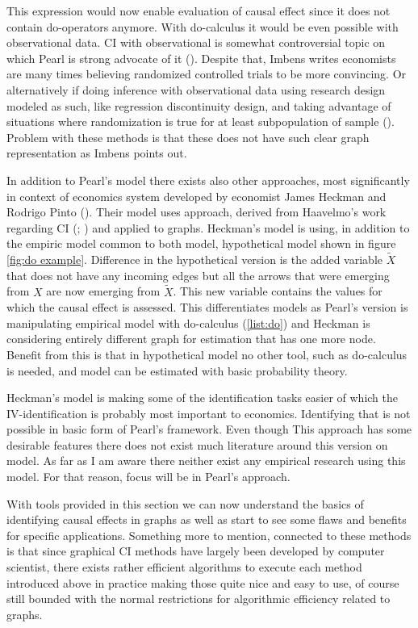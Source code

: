 \documentclass[main=english,12pt,a4paper,pdftex,econ,utf8]{aaltothesis}
\begin{document}
This expression would now enable evaluation of causal effect since it does not contain do-operators anymore. With do-calculus it would be even possible with observational data. CI with observational is somewhat controversial topic on which Pearl is strong advocate of it (\cite{Pearl2018}). Despite that, Imbens writes economists are many times believing randomized controlled trials to be more convincing. Or alternatively if doing inference with observational data using research design modeled as such, like regression discontinuity design, and taking advantage of situations where randomization is true for at least subpopulation of sample (\cite{imbes2020}). Problem with these methods is that these does not have such clear graph representation as Imbens points out.

In addition to Pearl's model there exists also other approaches, most significantly in context of economics system developed by economist James Heckman and Rodrigo Pinto (\cite{Heckman2015}). Their model uses approach, derived from Haavelmo's work regarding CI (\cite{Haavelmo1943}; \cite{Haavelmo1944}) and applied to graphs. Heckman's model is using, in addition to the empiric model common to both model, hypothetical model shown in figure \ref{fig:do example}. Difference in the hypothetical version is the added variable $\tilde X$ that does not have any incoming edges but all the arrows that were emerging from $X$ are now emerging from $\tilde X$. This new variable contains the values for which the causal effect is assessed. This differentiates models as Pearl's version is manipulating empirical model with do-calculus (\ref{list:do}) and Heckman is considering entirely different graph for estimation that has one more node. Benefit from this is that in hypothetical model no other tool, such as do-calculus is needed, and model can be estimated with basic probability theory.

Heckman's model is making some of the identification tasks easier of which the IV-identification is probably most important to economics. Identifying that is not possible in basic form of Pearl's framework. Even though This approach has some desirable features there does not exist much literature around this version on model. As far as I am aware there neither exist any empirical research using this model. For that reason, focus will be in Pearl's approach.

With tools provided in this section we can now understand the basics of identifying causal effects in graphs as well as start to see some flaws and benefits for specific applications. Something more to mention, connected to these methods is that since graphical CI methods have largely been developed by computer scientist, there exists rather efficient algorithms to execute each method introduced above in practice making those quite nice and easy to use, of course still bounded with the normal restrictions for algorithmic efficiency related to graphs.
\end{document}
